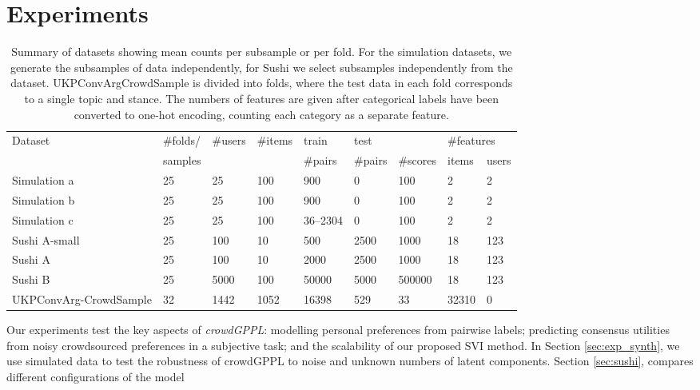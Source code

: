 \section{Experiments}\label{sec:expts}

\begin{table}[h]
\centering
\small
 \setlength{\tabcolsep}{4pt}
\begin{tabular}{p{1.8cm} p{1cm} p{1cm} l@{\hskip 0.4cm} l@{\hskip 0.5cm} l l@{\hskip 0.5cm} l l }
\toprule
Dataset & \#folds/ & \#users & \#items & train & \multicolumn{2}{l}{test} & \multicolumn{2}{l}{\#features} \\
              & samples &              &               & \#pairs  & \#pairs & \#scores          & items & users \\
\midrule
Simulation a & 25 & 25 & 100 & 900 & 0 & 100 & 2 & 2 \\
Simulation b & 25 & 25 & 100 & 900 & 0 & 100 & 2 & 2\\
Simulation c & 25 & 25 & 100 & 36--2304 & 0 & 100 & 2 & 2\\
\midrule
Sushi A-small & 25 & 100 & 10 & 500 & 2500 & 1000 & 18 & 123 \\
Sushi A & 25 & 100 & 10 & 2000 & 2500 & 1000 & 18 & 123 \\
Sushi B & 25 & 5000 & 100 & 50000 & 5000 & 500000 &  18 & 123 \\
\midrule
UKPConvArg-CrowdSample & 32 & 1442 & 1052 & 16398 & 529 & 33 & 32310 & 0
\\ \bottomrule
\end{tabular}
\caption{Summary of datasets showing mean counts per subsample or per fold. For the simulation datasets, we generate the subsamples of data independently, for Sushi we select subsamples independently from the dataset.  
UKPConvArgCrowdSample is divided into folds, where the test data in each fold corresponds to a single topic and stance. The numbers of features are given after categorical labels have been converted to one-hot encoding, counting
each category as a separate feature.
}
\label{tab:datasets}
\end{table}
Our experiments test the key aspects of \emph{crowdGPPL}: 
 modelling personal preferences from pairwise labels;
 predicting consensus utilities from noisy crowdsourced preferences
  in a subjective task; 
 and the scalability of our proposed SVI method.
In Section \ref{sec:exp_synth}, we use simulated data to test the robustness of crowdGPPL
to noise and unknown numbers of latent components.
Section \ref{sec:sushi}, 
compares different configurations of the model
